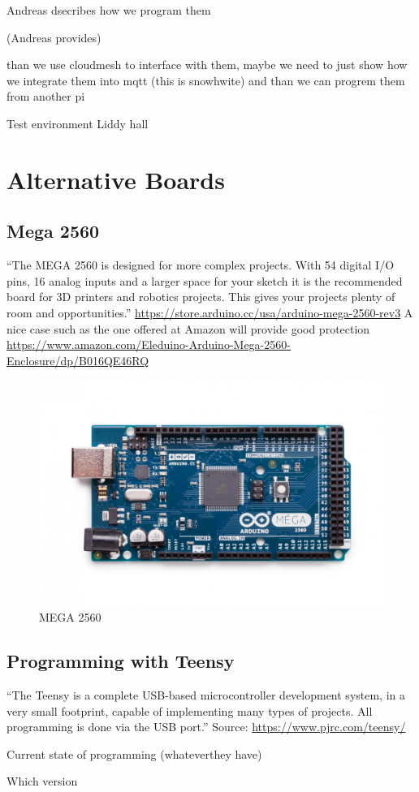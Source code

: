 Andreas dsecribes how we program them 

(Andreas provides)


than we use cloudmesh to interface with them, maybe we need to just
show how we integrate them into mqtt (this is snowhwite) and than we  
can progrem them from another pi

	Test environment Liddy hall 

\section{Alternative Boards}

\subsection{Mega 2560}

``The MEGA 2560 is designed for more complex projects. With 54 digital
I/O pins, 16 analog inputs and a larger space for your sketch it is
the recommended board for 3D printers and robotics projects. This
gives your projects plenty of room and opportunities.'' 
\url{https://store.arduino.cc/usa/arduino-mega-2560-rev3}
A nice case such as the one offered at Amazon will provide good
protection \url{https://www.amazon.com/Eleduino-Arduino-Mega-2560-Enclosure/dp/B016QE46RQ}


\begin{figure}
\centering
\includegraphics[width=0.25\columnwidth]{images/mega2560.jpg}
\caption{MEGA 2560}
\label{F:mega2560}
\end{figure}


\subsection{Programming with Teensy}

``The Teensy is a complete USB-based microcontroller development
system, in a very small footprint, capable of implementing many types
of projects. All programming is done via the USB port.'' Source: \url{https://www.pjrc.com/teensy/}

Current state of programming (whateverthey have)

Which version



